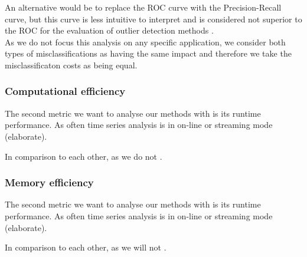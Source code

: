 An alternative would be to replace the ROC curve with the Precision-Recall curve, but this curve is less intuitive to interpret and is considered not superior to the ROC for the evaluation of outlier detection methods \cite{aggarwal2015outlier}.\\

As we do not focus this analysis on any specific application, we consider both types of misclassifications as having the same impact and therefore we take the misclassificaton costs as being equal.



\subsubsection{Computational efficiency}
The second metric we want to analyse our methods with is its runtime performance. As often time series analysis is in on-line or streaming mode (elaborate).

In comparison to each other, as we do not .



\subsubsection{Memory efficiency}
The second metric we want to analyse our methods with is its runtime performance. As often time series analysis is in on-line or streaming mode (elaborate).

In comparison to each other, as we will not .


